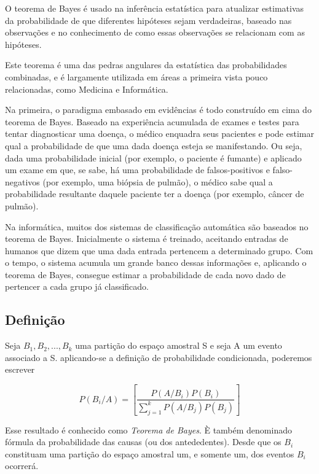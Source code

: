 O teorema de Bayes é usado na inferência estatística para
atualizar estimativas da probabilidade de que diferentes hipóteses
sejam verdadeiras, baseado nas observações e no conhecimento de
como essas observações se relacionam com as hipóteses.\vskip0.3cm

Este teorema é uma das pedras angulares da estatística das
probabilidades combinadas, e é largamente utilizada em áreas a
primeira vista pouco relacionadas, como Medicina e
Informática.\vskip0.3cm

Na primeira, o paradigma embasado em evidências é todo construído
em cima do teorema de Bayes. Baseado na experiência acumulada de
exames e testes para tentar diagnosticar uma doença, o médico
enquadra seus pacientes e pode estimar qual a probabilidade de que
uma dada doença esteja se manifestando. Ou seja, dada uma
probabilidade inicial (por exemplo, o paciente é fumante) e
aplicado um exame em que, se sabe, há uma probabilidade de
falsos-positivos e falso-negativos (por exemplo, uma biópsia de
pulmão), o médico sabe qual a probabilidade resultante daquele
paciente ter a doença (por exemplo, câncer de pulmão).\vskip0.3cm

Na informática, muitos dos sistemas de classificação automática
são baseados no teorema de Bayes. Inicialmente o sistema é
treinado, aceitando entradas de humanos que dizem que uma dada
entrada pertencem a determinado grupo. Com o tempo, o sistema
acumula um grande banco dessas informações e, aplicando o teorema
de Bayes, consegue estimar a probabilidade de cada novo dado de
pertencer a cada grupo já classificado.\vskip0.3cm


\subsection{Definição}

Seja $B_{1},B_{2},...,B_{k}$ uma partição do espaço amostral S e
seja A um evento associado a S. aplicando-se a definição de
probabilidade condicionada, poderemos escrever


\begin{equation}\label{bayes}
    P(B_{i}/A) =\left[ \frac{P(A/B_{i})P(B_{i})}{\sum_{j=1}^{k}P(A/B_{j})P(B_{j})} \right]
\end{equation}


Esse resultado é conhecido como \emph{Teorema de Bayes}. È também
denominado fórmula da probabilidade das causas (ou dos
antededentes). Desde que os $B_{i}$ constituam uma partição do
espaço amostral um, e somente um, dos eventos $B_{i}$ ocorrerá.

